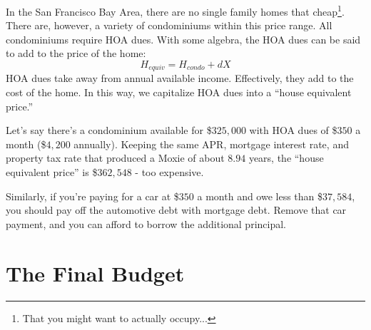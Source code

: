 \documentclass{article}
\begin{document}
In the San Francisco Bay Area, there are no single family homes
 that cheap\footnote{That you might want to actually occupy...}.
  There are, however, a variety of condominiums within this 
price range.  All condominiums require HOA dues.  With some 
algebra, the HOA dues can be said to add to the price of the home:
\begin{equation}
H_{equiv} = H_{condo} + dX
\end{equation}
HOA dues take away from annual available income.  Effectively, 
they add to the cost of the home.  In this way, we capitalize 
HOA dues into a ``house equivalent price.''

Let's say there's a condominium available for \$$325,000$ with 
HOA dues of \$$350$ a month (\$$4,200$ annually).  Keeping the 
same APR, mortgage interest rate, 
 and property tax rate that produced a Moxie of about $8.94$ years, 
the ``house equivalent price'' is  \$$362,548$ - too expensive.

Similarly, if you're paying for a car at \$$350$ a month and 
owe less than \$$37,584$, you should pay off the automotive debt 
with mortgage debt. Remove that car payment, and you can  
afford to borrow the additional principal.

\pagebreak

\section{The Final Budget}
\end{document}
